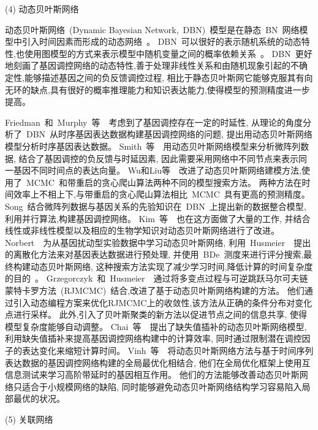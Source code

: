 (4) 动态贝叶斯网络

动态贝叶斯网络~(Dynamic Bayesian Network,~DBN)~模型是在静态~BN~网络模型中引入时间因素而形成的动态网络~\cite{dondelinger2010heterogeneous,grzegorczyk2010improvements}。
DBN~可以很好的表示随机系统的动态特性,也使用图模型的方式来表示模型中随机变量之间的概率依赖关系~\cite{hecker2009gene}。
DBN~更好地刻画了基因调控网络的动态特性,善于处理非线性关系和由随机现象引起的不确定性,能够描述基因之间的负反馈调控过程,
相比于静态贝叶斯网它能够克服其有向无环的缺点,具有很好的概率推理能力和知识表达能力,使得模型的预测精度进一步提高。

Friedman~和~Murphy~等~\cite{friedman2004inferring}~考虑到了基因调控存在一定的时延性,
从理论的角度分析了~DBN~从时序基因表达数据构建基因调控网络的问题, 提出用动态贝叶斯网络模型分析时序基因表达数据。
Smith~等~\cite{smith2006computational}~用动态贝叶斯网络模型来分析微阵列数据,
结合了基因调控的负反馈与时延因素, 因此需要采用网络中不同节点来表示同一基因不同时间点的表达向量。
Wu和Liu等~\cite{wu2008dynamic}~改进了动态贝叶斯网络建模方法,使用了~MCMC~和带重启的贪心爬山算法两种不同的模型搜索方法。 
两种方法在时间效率上不相上下,与带重启的贪心爬山算法相比~MCMC~具有更高的预测精度。
Song~\cite{song2009keller}结合微阵列数据与基因关系的先验知识在~DBN~上提出新的数据整合模型,利用并行算法,构建基因调控网络。
Kim~等~\cite{del2010efficient}~也在这方面做了大量的工作,
并结合线性或非线性模型以及相应的生物学知识对动态贝叶斯网络进行了改进。
Norbert~\cite{netrapalli2010greedy}~为从基因扰动型实验数据中学习动态贝叶斯网络,
利用~Husmeier~\cite{werhli2006comparative}~提出的离散化方法来对基因表达数据进行预处理,
并使用~BDe~测度来进行评分搜索,最终构建动态贝叶斯网络, 这种搜索方法实现了减少学习时间,降低计算的时间复杂度的目的~\cite{hurley2011gene}。
Grzegorczyk~和~Husmeier~\cite{grzegorczyk2010improvements}~通过将多变点过程与可逆跳跃马尔可夫链蒙特卡罗方法~(RJMCMC)~结合,改进了基于动态贝叶斯网络构建的方法。 他们通过引入动态编程方案来优化RJMCMC上的收敛性,该方法从正确的条件分布对变化点进行采样。 
此外,引入了贝叶斯聚类的新方法以促进节点之间的信息共享, 使得模型复杂度能够自动调整。
Chai~等~\cite{chai2012inferring}~提出了缺失值插补的动态贝叶斯网络模型,
利用缺失值插补来提高基因调控网络构建中的计算效率,
同时通过限制潜在调控因子的表达变化来缩短计算时间。
Vinh~等~\cite{vinh2012gene}~将动态贝叶斯网络方法与基于时间序列表达数据的基因调控网络构建的全局最优化相结合,
他们在全局优化框架上使用互信息测试来学习高阶带延时的基因相互作用。
他们的方法能够改善动态贝叶斯网络只适合于小规模网络的缺陷,
同时能够避免动态贝叶斯网络结构学习容易陷入局部最优的状况。

(5) 关联网络


